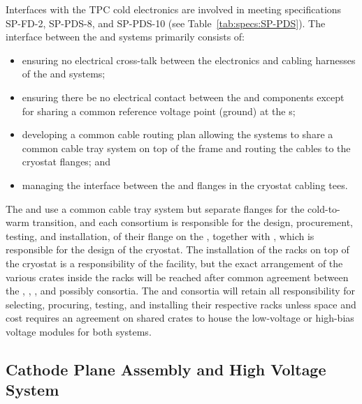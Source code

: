 Interfaces with the TPC cold electronics are involved in meeting specifications SP-FD-2, SP-PDS-8, and SP-PDS-10 (see Table~\ref{tab:specs:SP-PDS}).  The interface between the  and  systems primarily consists of:

\begin{itemize}
    \item ensuring no electrical cross-talk between the electronics and cabling harnesses of the  and  systems;
    \item ensuring there be no electrical contact between the  and  components except for sharing a common reference voltage point (ground) at the \fdth{}s;
    \item developing a common cable routing plan allowing the systems to share a common cable tray system on top of the  frame and routing the cables to the cryostat flanges; and 
    \item managing the interface between the  and  flanges in the cryostat cabling tees.
  \end{itemize}  
The  and  use a common cable tray system but separate flanges for the cold-to-warm transition, and each consortium is responsible for the design, procurement, testing, and installation, of their flange on the \fdth{}, together with , which is responsible for the design of the cryostat. 
The installation of the racks on top of the cryostat is a responsibility of the facility, but the exact arrangement of the various crates inside the racks will be reached after common agreement between the , , , and possibly  consortia. %
The  and  consortia will retain all responsibility for selecting, procuring, testing, and installing their respective racks unless space and cost requires an agreement on shared crates to house the low-voltage or high-bias voltage modules for both systems. 

\subsection{Cathode Plane Assembly and High Voltage System}
\label{sec:fdsp-pd-intfc-le}

